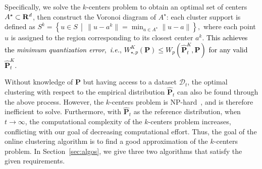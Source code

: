 \documentclass[12pt]{article}
\newcommand{\ie}{{\it i.e.}}
\newcommand{\reals}{{\bf R}}
\newcommand{\prob}{{\mathbf P}}
\newcommand{\barp}{p}
\newcommand{\ld}{W}
\newcommand{\RC}[1]{\textcolor{black}{#1}}
\newcommand{\RC}[1]{\textcolor{blue}{#1}}
\begin{document}
Specifically, we solve the $k$-centers problem to obtain an optimal set of centers \RC{$A^\star \subset \reals^d$}, then construct the Voronoi diagram of $A^\star$: 
each cluster support is defined as  
$ S^k =\left\{u \in S\,\middle|\,\|u - a^k\| = \min_{a \in A^\star}\|u - a\| \right\},$
where each point $u$ is assigned to the region corresponding to its closest center $a^k$. 
\RC{This achieves the {\it minimum quantization error},~\ie, $\ld^K_{\star,\barp}(\prob)  \leq  W_{\barp}(\hat{\prob}^{K}_t,\prob)$ for any valid $\hat{\prob}^K_t$.}

Without knowledge of $\prob$ but having access to a dataset $\mathcal{D}_t$, the optimal clustering with respect to the empirical distribution $\hat{\mathbf{P}}_t$ can also be found through the above process.
However, the $k$-centers problem is NP-hard~\cite{k-centers}, and is therefore inefficient to solve. 
Furthermore, with $\hat{\mathbf{P}}_t$ as the reference distribution, when $t \rightarrow \infty$, the computational complexity of the $k$-centers problem increases, conflicting with our goal of decreasing computational effort. 
Thus, the goal of the online clustering algorithm is to find a good approximation of the $k$-centers problem. In Section~\ref{sec:algos}, we give \ifpreprint three \else two \fi algorithms that satisfy the given requirements. 
\end{document}
